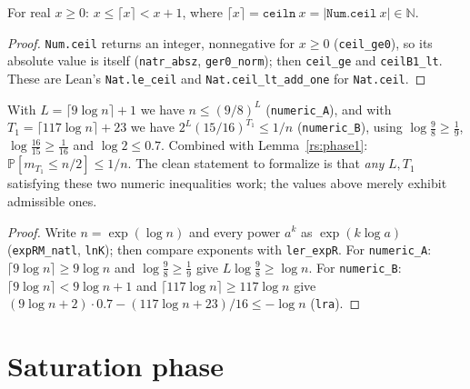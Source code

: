 \begin{lemma}\label{rs:ceiln}
  \rocqok
  For real $x \ge 0$: $x \le \lceil x \rceil < x + 1$, where
  $\lceil x \rceil = \texttt{ceiln}\ x = \lvert\texttt{Num.ceil}\ x\rvert
  \in \mathbb{N}$.
\end{lemma}
\begin{proof}
  \rocqok
  \texttt{Num.ceil} returns an integer, nonnegative for $x \ge 0$
  (\texttt{ceil\_ge0}), so its absolute value is itself
  (\texttt{natr\_absz}, \texttt{ger0\_norm}); then \texttt{ceil\_ge} and
  \texttt{ceilB1\_lt}. These are Lean's \texttt{Nat.le\_ceil} and
  \texttt{Nat.ceil\_lt\_add\_one} for \texttt{Nat.ceil}.
\end{proof}

\begin{lemma}\label{rs:constants}
  \rocqok
  With $L = \lceil 9 \log n \rceil + 1$ we have $n \le (9/8)^L$
  (\texttt{numeric\_A}), and with $T_1 = \lceil 117 \log n \rceil + 23$ we have
  $2^{L}(15/16)^{T_1} \le 1/n$ (\texttt{numeric\_B}), using
  $\log\tfrac98 \ge \tfrac19$, $\log\tfrac{16}{15} \ge \tfrac1{16}$ and
  $\log 2 \le 0.7$. Combined with Lemma~\ref{rs:phase1}:
  $\mathbb{P}[m_{T_1} \le n/2] \le 1/n$. The clean statement to formalize is
  that \emph{any} $L, T_1$ satisfying these two numeric inequalities work;
  the values above merely exhibit admissible ones.
\end{lemma}
\begin{proof}
  \rocqok
  Write $n = \exp(\log n)$ and every power $a^k$ as $\exp(k \log a)$
  (\texttt{expRM\_natl}, \texttt{lnK}); then compare exponents with
  \texttt{ler\_expR}. For \texttt{numeric\_A}: $\lceil 9\log n\rceil \ge
  9\log n$ and $\log\tfrac98 \ge \tfrac19$ give $L\log\tfrac98 \ge \log n$.
  For \texttt{numeric\_B}: $\lceil 9\log n\rceil < 9\log n + 1$ and
  $\lceil 117\log n\rceil \ge 117\log n$ give
  $(9\log n + 2)\cdot 0.7 - (117\log n + 23)/16 \le -\log n$
  (\texttt{lra}).
\end{proof}

\section{Saturation phase}\label{rs:sec:saturation}

